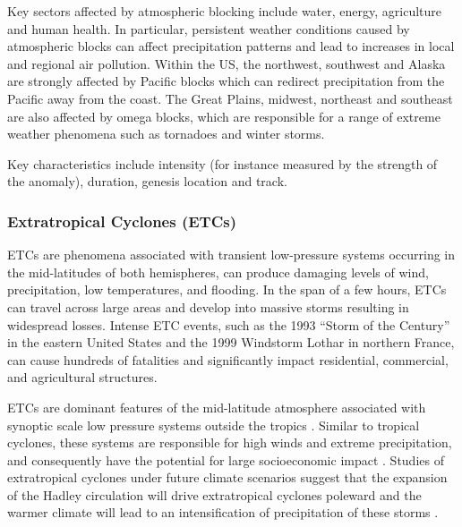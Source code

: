 \documentclass[11pt]{article}
\begin{document}

Key sectors affected by atmospheric blocking include water, energy, agriculture and human health.  In particular, persistent weather conditions caused by atmospheric blocks can affect precipitation patterns and lead to increases in local and regional air pollution.  Within the US, the northwest, southwest and Alaska are strongly affected by Pacific blocks which can redirect precipitation from the Pacific away from the coast.  The Great Plains, midwest, northeast and southeast are also affected by omega blocks, which are responsible for a range of extreme weather phenomena such as tornadoes and winter storms.

Key characteristics include intensity (for instance measured by the strength of the anomaly), duration, genesis location and track.

\subsubsection*{Extratropical Cyclones (ETCs)}

ETCs are phenomena associated with transient low-pressure systems occurring in the mid-latitudes of both hemispheres, can produce damaging levels of wind, precipitation, low temperatures, and flooding. In the span of a few hours, ETCs can travel across large areas and develop into massive storms resulting in widespread losses. Intense ETC events, such as the 1993 ``Storm of the Century'' in the eastern United States and the 1999 Windstorm Lothar in northern France, can cause hundreds of fatalities and significantly impact residential, commercial, and agricultural structures.

ETCs are dominant features of the mid-latitude atmosphere associated with synoptic scale low pressure systems outside the tropics \citep{serreze1995climatological}.  Similar to tropical cyclones, these systems are responsible for high winds and extreme precipitation, and consequently have the potential for large socioeconomic impact \citep{ulbrich2009extra}.  Studies of extratropical cyclones under future climate scenarios suggest that the expansion of the Hadley circulation will drive extratropical cyclones poleward \citep{bengtsson2006storm} and the warmer climate will lead to an intensification of precipitation of these storms \citep{bengtsson2009will, zappa2013multi}.
\end{document}
